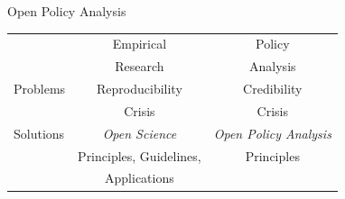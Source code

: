 \documentclass{beamer}
\begin{document}
\begin{frame}[noframenumbering]{Open Policy Analysis}
\begin{table}[ht]
\centering
\begin{tabular}[t]{|l|c|c|}
\hline
& Empirical  & Policy \\
& Research & Analysis \\

\hline
Problems & Reproducibility  &  Credibility \\
				 &  Crisis & Crisis \\
\hline
Solutions &  \textit{Open Science }&    \textit{Open Policy Analysis } \\
 & Principles, Guidelines,  &   Principles\\
 & Applications &   \\

\hline
\end{tabular}
\end{table}%
\end{frame}
\end{document}
